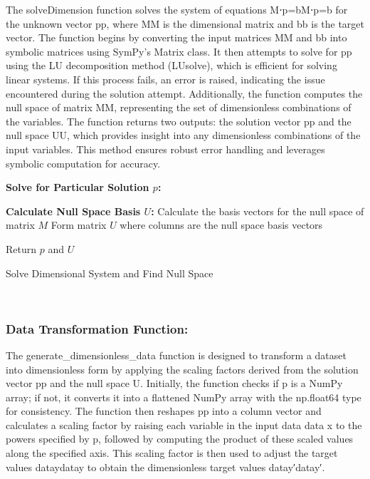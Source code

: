 \documentclass{article}
\begin{document}
The solveDimension function solves the system of equations M⋅p=bM⋅p=b for the unknown vector pp, where MM is the dimensional matrix and bb is the target vector. The function begins by converting the input matrices MM and bb into symbolic matrices using SymPy's Matrix class. It then attempts to solve for pp using the LU decomposition method (LUsolve), which is efficient for solving linear systems. If this process fails, an error is raised, indicating the issue encountered during the solution attempt. Additionally, the function computes the null space of matrix MM, representing the set of dimensionless combinations of the variables. The function returns two outputs: the solution vector pp and the null space UU, which provides insight into any dimensionless combinations of the input variables. This method ensures robust error handling and leverages symbolic computation for accuracy.\\



\begin{algorithm}[H]
\SetAlgoLined
{}

\textbf{Solve for Particular Solution \(p\):}\;

\textbf{Calculate Null Space Basis \(U\):}\;
Calculate the basis vectors for the null space of matrix \(M\)\;
Form matrix \(U\) where columns are the null space basis vectors\;

Return \(p\) and \(U\)\;

\caption{Solve Dimensional System and Find Null Space}
\label{alg:solve_dimension} %
\end{algorithm}\\






\subsubsection{Data Transformation Function:}


The generate\_dimensionless\_data function is designed to transform a dataset into dimensionless form by applying the scaling factors derived from the solution vector pp and the null space U. Initially, the function checks if p is a NumPy array; if not, it converts it into a flattened NumPy array with the np.float64 type for consistency. The function then reshapes pp into a column vector and calculates a scaling factor by raising each variable in the input data data x to the powers specified by p, followed by computing the product of these scaled values along the specified axis. This scaling factor is then used to adjust the target values dataydatay​ to obtain the dimensionless target values datay′datay′.\\
\end{document}
